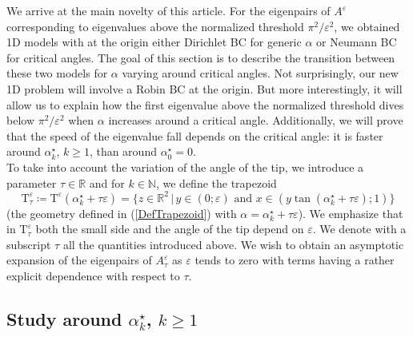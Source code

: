 \documentclass[11pt,a4paper]{article}
\newcommand{\eps}{\varepsilon}
\newcommand{\N}{\mathbb{N}}
\newcommand{\R}{\mathbb{R}}
\begin{document}
We arrive at the main novelty of this article. For the eigenpairs of $A^\eps$ corresponding to eigenvalues above the normalized threshold $\pi^2/\eps^2$, we obtained 1D models with at the origin either Dirichlet BC for generic $\alpha$ or Neumann BC for critical angles. The goal of this section is to describe the transition between these two models for $\alpha$ varying around critical angles. Not surprisingly, our new 1D problem will involve a Robin BC at the origin. But more interestingly, it will allow us to explain how the first eigenvalue above the normalized threshold dives below $\pi^2/\eps^2$ when $\alpha$ increases around a critical angle. Additionally, we will prove that the speed of the eigenvalue fall depends on the critical angle: it is faster around $\alpha_k^\star$, $k\ge1$, than around $\alpha_0^\star=0$. \\
\newline
To take into account the variation of the angle of the tip, we introduce a parameter $\tau\in\R$ and for $k\in\N$, we define the trapezoid
\[
\mathrm{T}^\eps_\tau\coloneqq\mathrm{T}^\eps(\alpha^\star_k+\tau\eps)= \{ z\in \R^2\,|\,y\in(0;\eps)\mbox{ and }x\in (y\tan(\alpha^\star_k+\tau\eps);1)\}
\]
(the geometry defined in (\ref{DefTrapezoid}) with $\alpha=\alpha^\star_k+\tau\eps$). We emphasize that in $\mathrm{T}^\eps_\tau$ both the small side and the angle of the tip depend on $\eps$. We denote with a subscript $\tau$ all the quantities introduced above. We wish to obtain an asymptotic expansion of the eigenpairs of $A^\eps_\tau$ as $\eps$ tends to zero with terms having a rather explicit dependence with respect to $\tau$. 

\subsection{Study around $\alpha^\star_k$, $k\ge1$}
\end{document}

